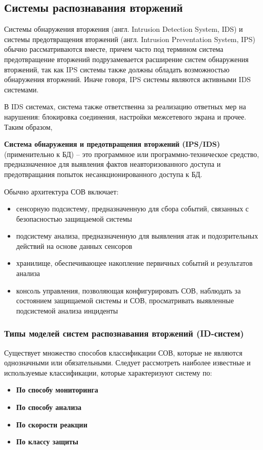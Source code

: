 \subsection{Системы распознавания вторжений}

Системы обнаружения вторжения (англ. Intrusion Detection System, IDS) и системы
предотвращения вторжений (англ. Intrusion Preventation System, IPS) обычно рассматриваются
вместе, причем часто под термином система предотвращение вторжений подрузамевается
расширение систем обнаружения вторжений, так как IPS системы также должны обладать
возможностью обнаружения вторжений. Иначе говоря, IPS системы являются активными IDS системами.

В IDS системах, система также ответственна за реализацию ответных мер на нарушения:
блокировка соединения, настройки межсетевого экрана и прочее. Таким образом,

\textbf{Система обнаружения и предотвращения вторжений (IPS/IDS)} (применительно к БД) -- это
программное или программно-техническое средство, предназначенное для выявления фактов
неавторизованного доступа и предотвращания попыток несанкционированного доступа к БД.

Обычно архитектура СОВ включает:
\begin{itemize}
	\item сенсорную подсистему, предназначенную для сбора событий, связанных с безопасностью защищаемой системы
	
	\item подсистему анализа, предназначенную для выявления атак и подозрительных действий на основе данных сенсоров
	
	\item хранилище, обеспечивающее накопление первичных событий и результатов анализа
	
	\item консоль управления, позволяющая конфигурировать СОВ, наблюдать за состоянием защищаемой системы и СОВ, просматривать выявленные подсистемой анализа инциденты
\end{itemize}



\subsubsection{Типы моделей систем распознавания вторжений (ID-систем)}

Существует множество способов классификации СОВ, которые не являются однозначными или
обязательными. Следует рассмотреть наиболее известные и используемые классификации,
которые характеризуют систему по:
\begin{itemize}
	\item \textbf{По способу мониторинга}

	\item \textbf{По способу анализа}

	\item \textbf{По скорости реакции}

	\item \textbf{По классу защиты}
\end{itemize}


